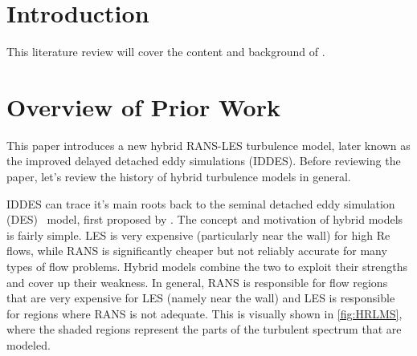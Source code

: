 \documentclass{ucb}
\begin{document}
\ucbcover{}

\section{Introduction}
This literature review will cover the content and background of \cite{shurHybridRANSLESApproach2008}. 

\section{Overview of Prior Work}
This paper introduces a new hybrid RANS-LES turbulence model, later known as the improved delayed detached eddy simulations (IDDES). Before reviewing the paper, let's review the history of hybrid turbulence models in general.

IDDES can trace it's main roots back to the seminal detached eddy simulation (DES)~\cite{SpalartP.R.JouW-H.StreletsM.Allamaras1997} model, first proposed by \citeauthor{SpalartP.R.JouW-H.StreletsM.Allamaras1997}. The concept and motivation of hybrid models is fairly simple. LES is very expensive (particularly near the wall) for high Re flows, while RANS is significantly cheaper but not reliably accurate for many types of flow problems. Hybrid models combine the two to exploit their strengths and cover up their weakness. In general, RANS is responsible for flow regions that are very expensive for LES (namely near the wall) and LES is responsible for regions where RANS is not adequate. This is visually shown in \cref{fig:HRLMS}, where the shaded regions represent the parts of the turbulent spectrum that are modeled.
\end{document}

